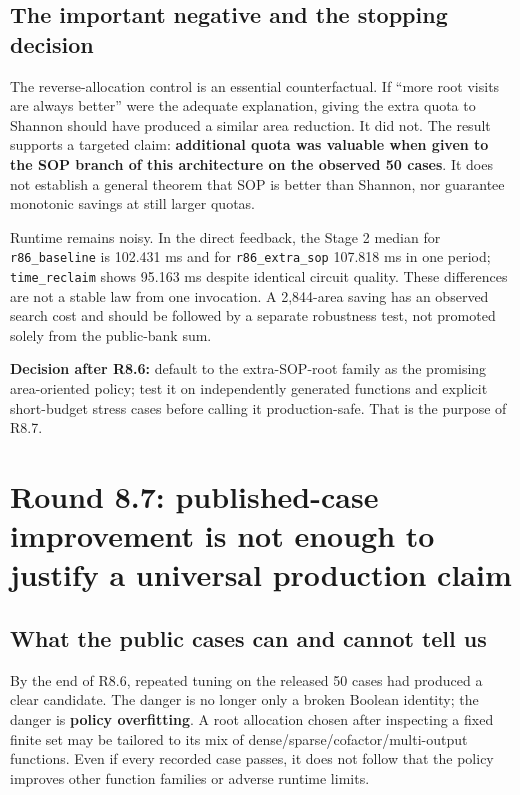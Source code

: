 \subsection{The important negative and the stopping decision}\label{the-important-negative-and-the-stopping-decision}

The reverse-allocation control is an essential counterfactual. If ``more root visits are always better'' were the adequate explanation, giving the extra quota to Shannon should have produced a similar area reduction. It did not. The result supports a targeted claim: \textbf{additional quota was valuable when given to the SOP branch of this architecture on the observed 50 cases}. It does not establish a general theorem that SOP is better than Shannon, nor guarantee monotonic savings at still larger quotas.

Runtime remains noisy. In the direct feedback, the Stage 2 median for \texttt{r86\_baseline} is 102.431 ms and for \texttt{r86\_extra\_sop} 107.818 ms in one period; \texttt{time\_reclaim} shows 95.163 ms despite identical circuit quality. These differences are not a stable law from one invocation. A 2,844-area saving has an observed search cost and should be followed by a separate robustness test, not promoted solely from the public-bank sum.

\begin{tcolorbox}[colback=ResearchBlue!6!white,colframe=ResearchSlate!55!white,boxrule=0.65pt,arc=1mm,breakable]
\textbf{Decision after R8.6:} default to the extra-SOP-root family as the promising area-oriented policy; test it on independently generated functions and explicit short-budget stress cases before calling it production-safe. That is the purpose of R8.7.
\end{tcolorbox}

\section{Round 8.7: published-case improvement is not enough to justify a universal production claim}\label{round-8.7-published-case-improvement-is-not-enough-to-justify-a-universal-production-claim}

\subsection{What the public cases can and cannot tell us}\label{what-the-public-cases-can-and-cannot-tell-us}

By the end of R8.6, repeated tuning on the released 50 cases had produced a clear candidate. The danger is no longer only a broken Boolean identity; the danger is \textbf{policy overfitting}. A root allocation chosen after inspecting a fixed finite set may be tailored to its mix of dense/sparse/cofactor/multi-output functions. Even if every recorded case passes, it does not follow that the policy improves other function families or adverse runtime limits.

